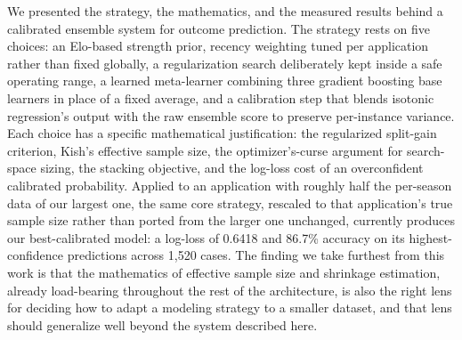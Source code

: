 \documentclass[conference]{IEEEtran}
\begin{document}
We presented the strategy, the mathematics, and the measured results
behind a calibrated ensemble system for outcome prediction. The
strategy rests on five choices: an Elo-based strength prior, recency
weighting tuned per application rather than fixed globally, a
regularization search deliberately kept inside a safe operating range,
a learned meta-learner combining three gradient boosting base
learners in place of a fixed average, and a calibration step that
blends isotonic regression's output with the raw ensemble score to
preserve per-instance variance. Each choice has a specific mathematical
justification: the regularized split-gain criterion, Kish's effective
sample size, the optimizer's-curse argument for search-space sizing,
the stacking objective, and the log-loss cost of an overconfident
calibrated probability. Applied to an application with roughly half
the per-season data of our largest one, the same core strategy,
rescaled to that application's true sample size rather than ported
from the larger one unchanged, currently produces our best-calibrated
model: a log-loss of 0.6418 and 86.7\% accuracy on its highest-
confidence predictions across 1,520 cases. The finding we take
furthest from this work is that the mathematics of effective sample
size and shrinkage estimation, already load-bearing throughout the
rest of the architecture, is also the right lens for deciding how to
adapt a modeling strategy to a smaller dataset, and that lens should
generalize well beyond the system described here.
\end{document}
